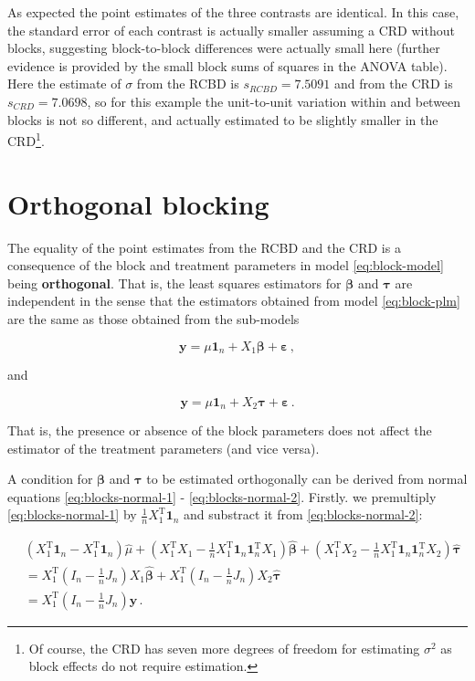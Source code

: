 \documentclass[
]{book}
\theoremstyle{definition}
\theoremstyle{definition}
\theoremstyle{definition}
\theoremstyle{definition}
\theoremstyle{remark}
\begin{document}
As expected the point estimates of the three contrasts are identical. In this case, the standard error of each contrast is actually smaller assuming a CRD without blocks, suggesting block-to-block differences were actually small here (further evidence is provided by the small block sums of squares in the ANOVA table). Here the estimate of \(\sigma\) from the RCBD is \(s_{RCBD} = 7.5091\) and from the CRD is \(s_{CRD} = 7.0698\), so for this example the unit-to-unit variation within and between blocks is not so different, and actually estimated to be slightly smaller in the CRD\footnote{Of course, the CRD has seven more degrees of freedom for estimating \(\sigma^2\) as block effects do not require estimation.}.

\hypertarget{blocks-orthogonal}{%
\section{Orthogonal blocking}\label{blocks-orthogonal}}

The equality of the point estimates from the RCBD and the CRD is a consequence of the block and treatment parameters in model \eqref{eq:block-model} being \textbf{orthogonal}. That is, the least squares estimators for \(\boldsymbol{\beta}\) and \(\boldsymbol{\tau}\) are independent in the sense that the estimators obtained from model \eqref{eq:block-plm} are the same as those obtained from the sub-models

\[
\boldsymbol{y}= \mu\boldsymbol{1}_n + X_1\boldsymbol{\beta} + \boldsymbol{\varepsilon}\,,
\]

and

\[
\boldsymbol{y}= \mu\boldsymbol{1}_n + X_2\boldsymbol{\tau} + \boldsymbol{\varepsilon}\,.
\]

That is, the presence or absence of the block parameters does not affect the estimator of the treatment parameters (and vice versa).

A condition for \(\boldsymbol{\beta}\) and \(\boldsymbol{\tau}\) to be estimated orthogonally can be derived from normal equations \eqref{eq:blocks-normal-1} - \eqref{eq:blocks-normal-2}. Firstly. we premultiply \eqref{eq:blocks-normal-1} by \(\frac{1}{n}X_1^{\mathrm{T}}\boldsymbol{1}_n\) and substract it from \eqref{eq:blocks-normal-2}:

\begin{align}
 & \left(X_1^{\mathrm{T}}\boldsymbol{1}_n - X_1^{\mathrm{T}}\boldsymbol{1}_n\right)\hat{\mu} + \left(X_1^{\mathrm{T}}X_1 - \frac{1}{n}X_1^{\mathrm{T}}\boldsymbol{1}_n\boldsymbol{1}_n^{\mathrm{T}}X_1\right)\hat{\boldsymbol{\beta}} + \left(X_1^{\mathrm{T}}X_2 - \frac{1}{n}X_1^{\mathrm{T}}\boldsymbol{1}_n\boldsymbol{1}_n^{\mathrm{T}}X_2\right)\hat{\boldsymbol{\tau}} \nonumber \\
 & = X_1^{\mathrm{T}}\left(I_n - \frac{1}{n}J_n\right)X_1\hat{\boldsymbol{\beta}} + X_1^{\mathrm{T}}\left(I_n - \frac{1}{n}J_n\right)X_2\hat{\boldsymbol{\tau}} \nonumber \\
 & =  X_1^{\mathrm{T}}\left(I_n - \frac{1}{n}J_n\right)\boldsymbol{y}\label{eq:blocks-orth-ne1}\,.
\end{align}
\end{document}
